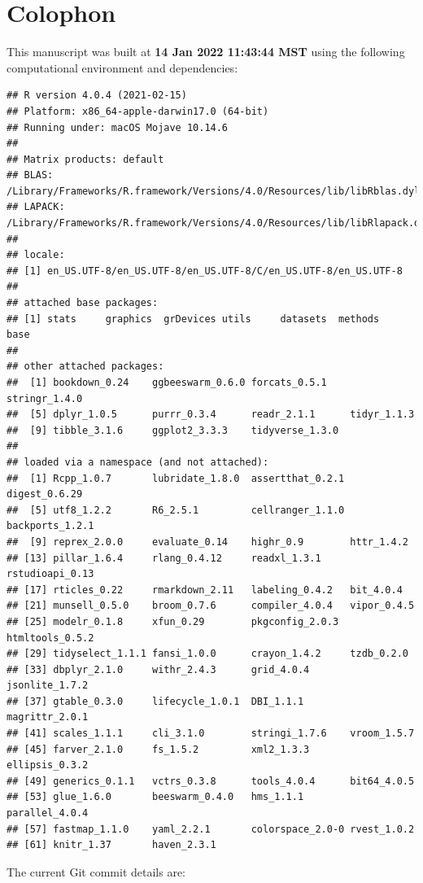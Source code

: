 \documentclass[smallextended]{svjour3}       %
\begin{document}
\hypertarget{colophon}{%
\section{Colophon}\label{colophon}}

This manuscript was built at \textbf{14 Jan 2022 11:43:44 MST} using the following computational environment and dependencies:

\begin{verbatim}
## R version 4.0.4 (2021-02-15)
## Platform: x86_64-apple-darwin17.0 (64-bit)
## Running under: macOS Mojave 10.14.6
## 
## Matrix products: default
## BLAS:   /Library/Frameworks/R.framework/Versions/4.0/Resources/lib/libRblas.dylib
## LAPACK: /Library/Frameworks/R.framework/Versions/4.0/Resources/lib/libRlapack.dylib
## 
## locale:
## [1] en_US.UTF-8/en_US.UTF-8/en_US.UTF-8/C/en_US.UTF-8/en_US.UTF-8
## 
## attached base packages:
## [1] stats     graphics  grDevices utils     datasets  methods   base     
## 
## other attached packages:
##  [1] bookdown_0.24    ggbeeswarm_0.6.0 forcats_0.5.1    stringr_1.4.0   
##  [5] dplyr_1.0.5      purrr_0.3.4      readr_2.1.1      tidyr_1.1.3     
##  [9] tibble_3.1.6     ggplot2_3.3.3    tidyverse_1.3.0 
## 
## loaded via a namespace (and not attached):
##  [1] Rcpp_1.0.7       lubridate_1.8.0  assertthat_0.2.1 digest_0.6.29   
##  [5] utf8_1.2.2       R6_2.5.1         cellranger_1.1.0 backports_1.2.1 
##  [9] reprex_2.0.0     evaluate_0.14    highr_0.9        httr_1.4.2      
## [13] pillar_1.6.4     rlang_0.4.12     readxl_1.3.1     rstudioapi_0.13 
## [17] rticles_0.22     rmarkdown_2.11   labeling_0.4.2   bit_4.0.4       
## [21] munsell_0.5.0    broom_0.7.6      compiler_4.0.4   vipor_0.4.5     
## [25] modelr_0.1.8     xfun_0.29        pkgconfig_2.0.3  htmltools_0.5.2 
## [29] tidyselect_1.1.1 fansi_1.0.0      crayon_1.4.2     tzdb_0.2.0      
## [33] dbplyr_2.1.0     withr_2.4.3      grid_4.0.4       jsonlite_1.7.2  
## [37] gtable_0.3.0     lifecycle_1.0.1  DBI_1.1.1        magrittr_2.0.1  
## [41] scales_1.1.1     cli_3.1.0        stringi_1.7.6    vroom_1.5.7     
## [45] farver_2.1.0     fs_1.5.2         xml2_1.3.3       ellipsis_0.3.2  
## [49] generics_0.1.1   vctrs_0.3.8      tools_4.0.4      bit64_4.0.5     
## [53] glue_1.6.0       beeswarm_0.4.0   hms_1.1.1        parallel_4.0.4  
## [57] fastmap_1.1.0    yaml_2.2.1       colorspace_2.0-0 rvest_1.0.2     
## [61] knitr_1.37       haven_2.3.1
\end{verbatim}

The current Git commit details are:
\end{document}
